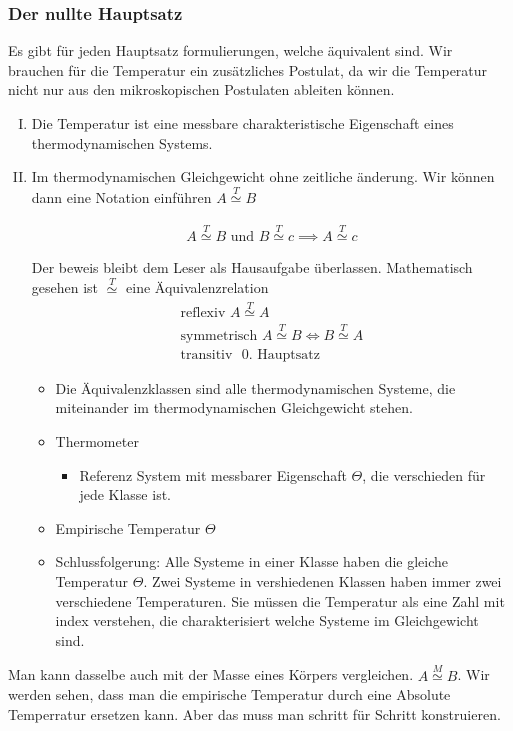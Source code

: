 \subsubsection*{Der nullte Hauptsatz}
Es gibt f\"ur jeden Hauptsatz formulierungen, welche \"aquivalent sind.
 Wir brauchen f\"ur die Temperatur ein zus\"atzliches
Postulat, da wir die Temperatur nicht nur aus den mikroskopischen Postulaten ableiten k\"onnen.
\begin{enumerate}[I)]
  \item Die Temperatur ist eine messbare charakteristische Eigenschaft
    eines thermodynamischen Systems.
  \item Im thermodynamischen Gleichgewicht ohne zeitliche \"anderung.
    Wir k\"onnen dann eine Notation einf\"uhren 
    $A \overset{T}{\simeq} B$

    \begin{satz}
      \begin{align*}
        A \overset{T}{\simeq} B \text{ und } B \overset{T}{\simeq} c \implies
        A \overset{T}{\simeq} c
      \end{align*}
    \end{satz}
    Der beweis bleibt dem Leser als Hausaufgabe \"uberlassen.
    Mathematisch gesehen ist $\overset{T}{\simeq}$ eine \"Aquivalenzrelation
    \begin{align*}
      \text{reflexiv } A \overset{T}{\simeq} A \\
      \text{symmetrisch } A \overset{T}{\simeq} B \iff B \overset{T}{\simeq} A\\
      \text{transitiv } \text{ 0. Hauptsatz}
    \end{align*}
    \begin{itemize}
      \item Die \"Aquivalenzklassen sind alle thermodynamischen Systeme,
        die miteinander im thermodynamischen Gleichgewicht stehen.

      \item Thermometer
        \begin{itemize}
          \item Referenz System mit messbarer Eigenschaft $\Theta$,
            die verschieden f\"ur jede Klasse ist.
        \end{itemize}
      \item Empirische Temperatur $\Theta$
      \item Schlussfolgerung: Alle Systeme in einer Klasse haben die 
        gleiche Temperatur $\Theta$. Zwei Systeme in vershiedenen Klassen
        haben immer zwei verschiedene Temperaturen. Sie m\"ussen die 
        Temperatur als eine Zahl mit index verstehen, die charakterisiert
        welche Systeme im Gleichgewicht sind.
    \end{itemize}
\end{enumerate} 
Man kann dasselbe auch mit der Masse eines K\"orpers vergleichen.
$A \overset{M}{\simeq} B$.  Wir werden sehen, dass man die empirische Temperatur durch
eine Absolute Temperratur ersetzen kann. Aber das muss man schritt f\"ur
Schritt konstruieren.


